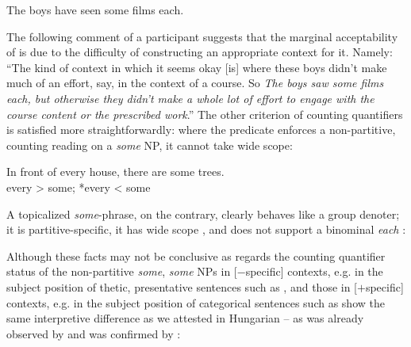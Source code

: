 \documentclass[output=paper]{langscibook}
\begin{document}
\ea The boys have seen some films each. \label{kis-zet:film}
\z

\noindent The following comment of a participant suggests that the marginal acceptability of  is due to the difficulty of constructing an appropriate context for it. Namely: ``The kind of context in which it seems okay [is] where these boys didn't make much of an effort, say, in the context of a course. So \textit{The boys saw some films each, but otherwise they didn't make a whole lot of effort to engage with the course content or the prescribed work}.'' 
The other criterion of counting quantifiers is satisfied more straightforwardly: where the predicate enforces a non-partitive, counting reading on a \textit{some} NP, it cannot take wide scope:

\ea In front of every house, there are some trees.\\
every > some; *every < some
\z

\noindent A topicalized \textit{some}-phrase, on the contrary, clearly behaves like a group denoter; it is partitive-specific, it has wide scope , and does not support a binominal \textit{each} :

\eal
{}\label{kis-zet:blossom}
\label{kis-zet:some films}
\zl

\noindent Although these facts may not be conclusive as regards the counting quantifier status of the non-partitive \textit{some}, \textit{some} NPs in [$-$specific] contexts, e.g. in the subject position of thetic, presentative sentences such as , and those in [$+$specific] contexts, e.g. in the subject position of categorical sentences such as  show the same interpretive difference as we attested in Hungarian – as was already observed by \citet{diesing1992indefinites} and was confirmed by \citet{vonfintel1998evidence}:

\ea\label{kis-zet:some major mistakes}
\z
\z

\ea\label{kis-zet:some mistakes}
\z
\z

\end{document}
